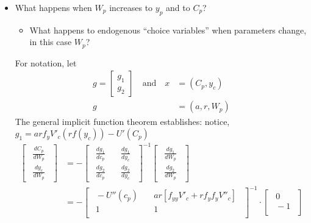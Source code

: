 \documentclass[14pt,notitlepage]{article}
\begin{document}
\begin{itemize}
\item What happens when $W_p$ increases to $y_p$ and to $C_p$?
    \begin{itemize}
    \item What happens to endogenous ``choice variables'' when parameters change, in this case $W_p$?
    \end{itemize}
For notation, let
\begin{align*}
g = \begin{bmatrix}
        g_1 \\
        g_2
    \end{bmatrix} \quad \text{and} \quad x &= (C_p, y_c) \\
                                         g &= (a, r, W_p)
\end{align*}
The general implicit function theorem establishes:
notice, \quad $g_1 = a r f_y V'_{c} (r f(y_c)) - U'(C_p)$
\begin{align*}
\begin{bmatrix}
    \ \ \frac{dC_p}{dW_p}\ \ \\
    \ \ \frac{dy_c}{dW_p}\ \
\end{bmatrix} &= - \begin{bmatrix}
                    \ \ \frac{dg_1}{dc_p} \quad &\frac{dg_1}{dy_c}\ \ \\
                    \ \ \frac{dg_2}{dc_p} \quad &\frac{dg_2}{dy_c}\ \
                  \end{bmatrix}^{-1} \begin{bmatrix}
                                        \ \ \frac{dg_1}{dW_p}\ \ \\
                                        \ \ \frac{dg_2}{dW_p}\ \
                                     \end{bmatrix} \\
              &= - \begin{bmatrix}
                        \ \ -U''(c_p) \quad &a r [f_{yy} V'_c + r f_y f_y V''_c]\ \ \\
                        \ \ 1 \quad &1\ \ \\
                    \end{bmatrix}^{-1} \cdot \begin{bmatrix}
                                                \ \ 0 \ \ \\
                                                \ \ -1 \ \ \\
                                             \end{bmatrix} \\

\end{align*}
\end{itemize}
\end{document}
